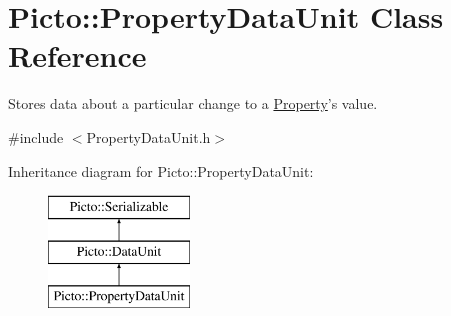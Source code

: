 \hypertarget{class_picto_1_1_property_data_unit}{\section{Picto\-:\-:Property\-Data\-Unit Class Reference}
\label{class_picto_1_1_property_data_unit}
}


Stores data about a particular change to a \hyperlink{class_picto_1_1_property}{Property}'s value.  




{\ttfamily \#include $<$Property\-Data\-Unit.\-h$>$}

Inheritance diagram for Picto\-:\-:Property\-Data\-Unit\-:\begin{figure}[H]
\begin{center}
\leavevmode
\includegraphics[height=3.000000cm]{class_picto_1_1_property_data_unit}
\end{center}
\end{figure}
